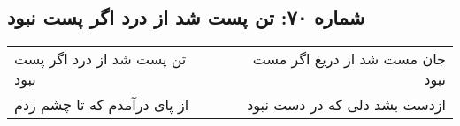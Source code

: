 \begin{center}
\section*{شماره ۷۰: تن پست شد از درد اگر پست نبود}
\label{sec:070}
\begin{longtable}{l p{0.5cm} r}
تن پست شد از درد اگر پست نبود
&&
جان مست شد از دریغ اگر مست نبود
\\
از پای درآمدم که تا چشم زدم
&&
ازدست بشد دلی که در دست نبود
\\
\end{longtable}
\end{center}
